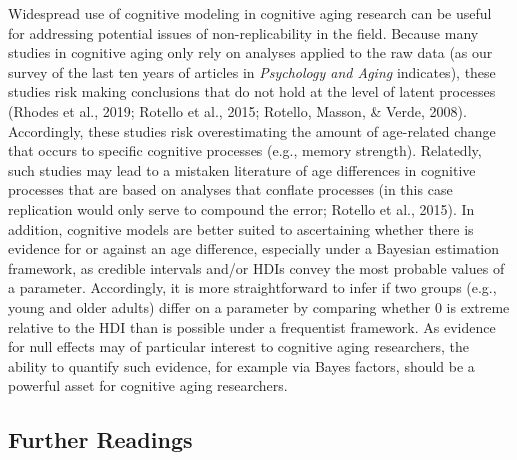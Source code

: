 \documentclass[
  english,
  ,man,floatsintext]{apa6}
\begin{document}
Widespread use of cognitive modeling in cognitive aging research can be useful for addressing potential issues of non-replicability in the field. Because many studies in cognitive aging only rely on analyses applied to the raw data (as our survey of the last ten years of articles in \emph{Psychology and Aging} indicates), these studies risk making conclusions that do not hold at the level of latent processes (Rhodes et al., 2019; Rotello et al., 2015; Rotello, Masson, \& Verde, 2008). Accordingly, these studies risk overestimating the amount of age-related change that occurs to specific cognitive processes (e.g., memory strength). Relatedly, such studies may lead to a mistaken literature of age differences in cognitive processes that are based on analyses that conflate processes (in this case replication would only serve to compound the error; Rotello et al., 2015). In addition, cognitive models are better suited to ascertaining whether there is evidence for or against an age difference, especially under a Bayesian estimation framework, as credible intervals and/or HDIs convey the most probable values of a parameter. Accordingly, it is more straightforward to infer if two groups (e.g., young and older adults) differ on a parameter by comparing whether 0 is extreme relative to the HDI than is possible under a frequentist framework. As evidence for null effects may of particular interest to cognitive aging researchers, the ability to quantify such evidence, for example via Bayes factors, should be a powerful asset for cognitive aging researchers.

\hypertarget{further-readings}{%
\subsection{Further Readings}\label{further-readings}}
\end{document}
